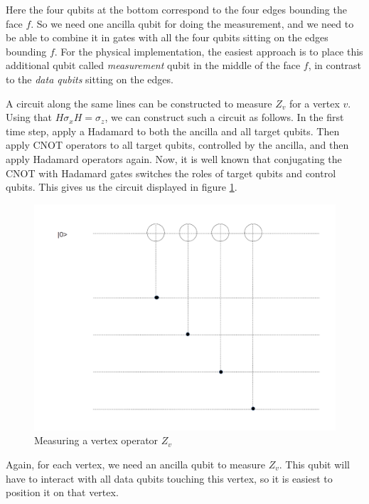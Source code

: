 \documentclass[a4paper, draft]{article}
\theoremstyle{own}
\theoremstyle{remark}
\begin{document}
Here the four qubits at the bottom correspond to the four edges bounding the face $f$. So we need one ancilla qubit for doing the measurement, and we need to be able to combine it in gates with all the four qubits sitting on the edges bounding $f$. For the physical implementation, the easiest approach is to place this additional qubit called \emph{measurement} qubit in the middle of the face $f$, in contrast to the \emph{data qubits} sitting on the edges.

A circuit along the same lines can be constructed to measure $Z_v$ for a vertex $v$. Using that $H \sigma_x H = \sigma_z$, we can construct such a circuit as follows. In the first time step, apply a Hadamard to both the ancilla and all target qubits. Then apply CNOT operators to all target qubits, controlled by the ancilla, and then apply Hadamard operators again. Now, it is well known that conjugating the CNOT with Hadamard gates switches the roles of target qubits and control qubits. This gives us the circuit displayed in figure \ref{fig:MeasuringZv}.


\begin{figure}
\centering
\includegraphics[width=0.7\linewidth]{images/MeasuringZv}
\caption[Measuring a vertex operator $Z_v$]{Measuring a vertex operator $Z_v$}
\label{fig:MeasuringZv}
\end{figure}

Again, for each vertex, we need an ancilla qubit to measure $Z_v$. This qubit will have to interact with all data qubits touching this vertex, so it is easiest to position it on that vertex. 
\end{document}
